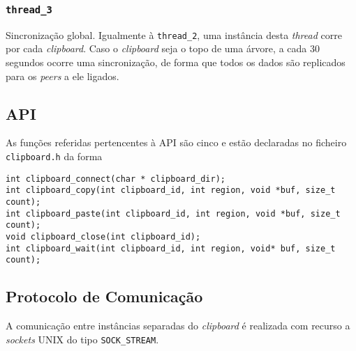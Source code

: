 \documentclass{article}
\begin{document}
\subsubsection{\texttt{thread\_3}}

Sincronização global. Igualmente à \texttt{thread\_2}, uma instância desta \textit{thread} corre por cada \textit{clipboard}. Caso o \textit{clipboard} seja o topo de uma árvore, a cada 30 segundos ocorre uma sincronização, de forma que todos os dados são replicados para os \textit{peers} a ele ligados. 

\subsection{API}

As funções referidas pertencentes à API são cinco e estão declaradas no
ficheiro \texttt{clipboard.h} da forma
\begin{verbatim}
int clipboard_connect(char * clipboard_dir);
int clipboard_copy(int clipboard_id, int region, void *buf, size_t count);
int clipboard_paste(int clipboard_id, int region, void *buf, size_t count);
void clipboard_close(int clipboard_id);
int clipboard_wait(int clipboard_id, int region, void* buf, size_t count);
\end{verbatim}

\subsection{Protocolo de Comunicação}

A comunicação entre instâncias separadas do \textit{clipboard} é realizada
com recurso a \textit{sockets} UNIX do tipo \texttt{SOCK\_STREAM}.
\end{document}
